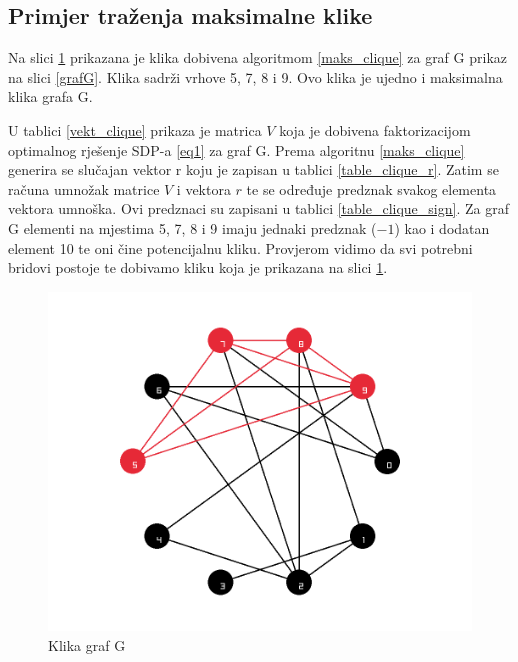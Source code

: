 \documentclass[diplomskirad]{fer}
\begin{document}
\subsection{Primjer traženja maksimalne klike}
Na slici \ref{fig:klika} prikazana je klika dobivena algoritmom \ref{maks_clique} za graf G prikaz na slici \ref{grafG}. Klika sadrži vrhove 5, 7, 8 i 9.
Ovo klika je ujedno i maksimalna klika grafa G.

U tablici \ref{vekt_clique} prikaza je matrica $V$ koja je dobivena faktorizacijom optimalnog rješenje SDP-a \ref{eq1} za graf G. Prema algoritnu \ref{maks_clique}
generira se slučajan vektor r koju je zapisan u tablici \ref{table_clique_r}. Zatim se računa umnožak matrice $V$ i vektora $r$ te se određuje predznak
svakog elementa vektora umnoška. Ovi predznaci su zapisani u tablici \ref{table_clique_sign}. Za graf G elementi na mjestima 5, 7, 8 i 9 imaju jednaki predznak ($-1$)
kao i dodatan element 10 te oni čine potencijalnu kliku. Provjerom vidimo da svi potrebni bridovi postoje te dobivamo kliku koja je prikazana na slici \ref{fig:klika}.

\begin{figure}
  \centering
  \includegraphics[scale=0.4]{images/max_clique.png}
  \caption{Klika graf G}
  \label{fig:klika}
\end{figure}
\end{document}
